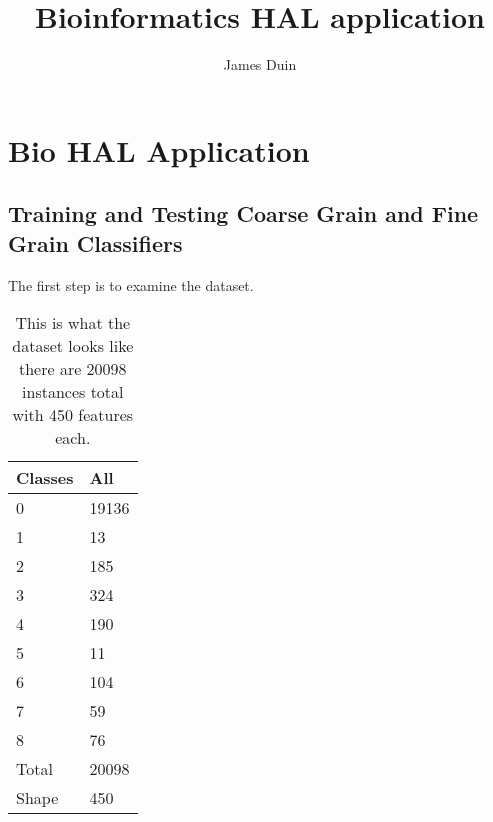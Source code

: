 \documentclass[ms]{nuthesis}
\begin{document}
\frontmatter


\title{Bioinformatics HAL application}
\author{James Duin}

\maketitle


\chapter{Bio HAL Application}\label{chap:math}
\section{Training and Testing Coarse Grain and Fine Grain Classifiers}
\par The first step is to examine the dataset.
\FloatBarrier
\begin{table}[h]
  \centering
  \begin{tabular}{|l||l|}\toprule
    Classes & All \\ \midrule
    0 & 19136 \\
    1 & 13 \\
    2 & 185 \\
    3 & 324 \\
    4 & 190 \\
    5 & 11 \\
    6 & 104 \\
    7 & 59 \\
    8 & 76 \\
    Total & 20098 \\
    Shape & 450 \\
 \bottomrule
  \end{tabular}
  \caption{This is what the dataset looks like there are 20098 instances total with 450 features each.}
  \label{tab:ClassesAll}
\end{table}
\FloatBarrier
\end{document}
